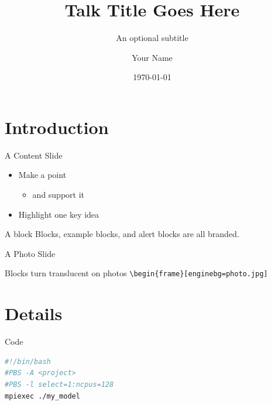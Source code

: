 \documentclass[aspectratio=169]{beamer}
\title{Talk Title Goes Here}
\subtitle{An optional subtitle}
\author{Your Name}
\institute{Your Title, Your Lab, NSF NCAR}
\date{\today}
\begin{document}
\begin{frame}
  \titlepage
\end{frame}

\section{Introduction}

\begin{frame}{A Content Slide}
  \begin{itemize}
  \item Make a point
    \begin{itemize}
    \item and support it
    \end{itemize}
  \item Highlight \alert{one key idea}
  \end{itemize}
  \begin{block}{A block}
    Blocks, example blocks, and alert blocks are all branded.
  \end{block}
\end{frame}

\begin{frame}[enginebg=images/wallpaper/mesa_lab.jpg]{A Photo Slide}
  \vfill
  \begin{block}{Blocks turn translucent on photos}
    \texttt{\textbackslash begin\{frame\}[enginebg=photo.jpg]}
  \end{block}
\end{frame}

\section{Details}

\begin{frame}[fragile]{Code}
\begin{lstlisting}[language=bash]
#!/bin/bash
#PBS -A <project>
#PBS -l select=1:ncpus=128
mpiexec ./my_model
\end{lstlisting}
\end{frame}

\end{document}
